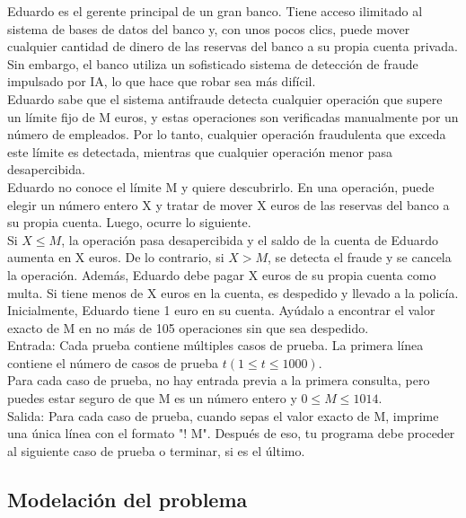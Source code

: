 \documentclass[
10pt, %
a4paper, %
oneside, %
headinclude,footinclude, %
BCOR5mm, %
]{scrartcl}
\begin{document}
Eduardo es el gerente principal de un gran banco. Tiene acceso ilimitado al sistema de bases de datos del banco y, con unos pocos clics, puede mover cualquier cantidad de dinero de las reservas del banco a su propia cuenta privada. Sin embargo, el banco utiliza un sofisticado sistema de detección de fraude impulsado por IA, lo que hace que robar sea más difícil. \\

Eduardo sabe que el sistema antifraude detecta cualquier operación que supere un límite fijo de M euros, y estas operaciones son verificadas manualmente por un número de empleados. Por lo tanto, cualquier operación fraudulenta que exceda este límite es detectada, mientras que cualquier operación menor pasa desapercibida.\\

Eduardo no conoce el límite M y quiere descubrirlo. En una operación, puede elegir un número entero X y tratar de mover X euros de las reservas del banco a su propia cuenta. Luego, ocurre lo siguiente.\\

Si $X \leq M$, la operación pasa desapercibida y el saldo de la cuenta de Eduardo aumenta en X euros.  
De lo contrario, si $X > M$, se detecta el fraude y se cancela la operación. Además, Eduardo debe pagar X euros de su propia cuenta como multa. Si tiene menos de X euros en la cuenta, es despedido y llevado a la policía.  
Inicialmente, Eduardo tiene 1 euro en su cuenta. Ayúdalo a encontrar el valor exacto de M en no más de 105 operaciones sin que sea despedido.\\

Entrada:
Cada prueba contiene múltiples casos de prueba. La primera línea contiene el número de casos de prueba $t (1 \leq t \leq 1000)$.\\

Para cada caso de prueba, no hay entrada previa a la primera consulta, pero puedes estar seguro de que M es un número entero y $0 \leq M \leq 1014$.\\

Salida:
Para cada caso de prueba, cuando sepas el valor exacto de M, imprime una única línea con el formato "! M". Después de eso, tu programa debe proceder al siguiente caso de prueba o terminar, si es el último.\\


\subsection{Modelación del problema}
\end{document}

